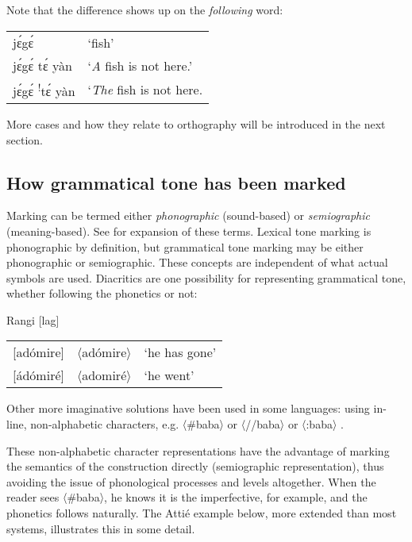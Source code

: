 \documentclass[output=paper]{langscibook}
\begin{document}
Note that the difference shows up on the \textit{following} word:

\begin{tabular}{@{}ll@{}}
jɛ́gɛ́ &  ‘fish’\\
jɛ́gɛ́  tɛ́ yàn&‘\textit{A} fish is not here.'\\
jɛ́gɛ́ \textsuperscript{!}tɛ́ yàn& ‘\textit{The} fish is not here.\\
\end{tabular}
\z
More cases and how they relate to orthography will be introduced in the next section.

\subsection{How grammatical tone has been marked}
\begin{sloppypar}
Marking can be termed either \textit{phonographic} (sound-based) or \textit{semiographic} (mean\-ing-based). See  \citet{Roberts2013} for expansion of these terms. Lexical tone marking is phonographic by definition, but grammatical tone marking may be either phonographic or semiographic. These concepts are independent of what actual symbols are used. Diacritics are one possibility for representing grammatical tone, whether following the phonetics or not:
\end{sloppypar}

\ea
Rangi [lag] \citep{Stegen2005} 

\begin{tabular}{@{}lll@{}}
[adómire] & 〈adómire〉 & `he has gone’ \\
{[}ádómiré{]} & 〈adomiré〉 & `he went’ 
\end{tabular}
\z

Other more imaginative solutions have been used in some languages: using in-line, non-alphabetic characters, e.g. 〈\#baba〉  or  〈//baba〉  or  〈:baba〉 \citep{Roberts2013}. 

\begin{sloppypar}
These non-alphabetic character representations have the advantage of marking the semantics of the construction directly (semiographic representation), thus avoiding the issue of phonological processes and levels altogether. When the reader sees 〈\#baba〉, he knows it is the imperfective, for example, and the phonetics follows naturally. The Attié example below, more extended than most systems, illustrates this in some detail. 
\end{sloppypar}
\end{document}
